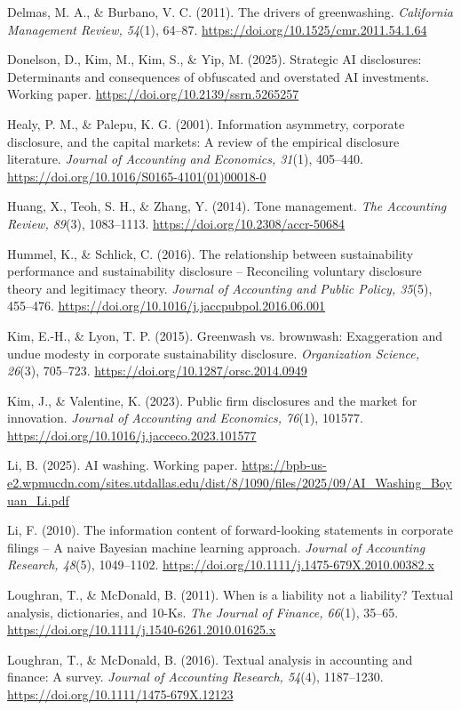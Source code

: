 Delmas, M. A., \& Burbano, V. C. (2011). The drivers of greenwashing. \textit{California Management Review, 54}(1), 64--87. \url{https://doi.org/10.1525/cmr.2011.54.1.64}

Donelson, D., Kim, M., Kim, S., \& Yip, M. (2025). Strategic AI disclosures: Determinants and consequences of obfuscated and overstated AI investments. Working paper. \url{https://doi.org/10.2139/ssrn.5265257}

Healy, P. M., \& Palepu, K. G. (2001). Information asymmetry, corporate disclosure, and the capital markets: A review of the empirical disclosure literature. \textit{Journal of Accounting and Economics, 31}(1), 405--440. \url{https://doi.org/10.1016/S0165-4101(01)00018-0}

Huang, X., Teoh, S. H., \& Zhang, Y. (2014). Tone management. \textit{The Accounting Review, 89}(3), 1083--1113. \url{https://doi.org/10.2308/accr-50684}

Hummel, K., \& Schlick, C. (2016). The relationship between sustainability performance and sustainability disclosure -- Reconciling voluntary disclosure theory and legitimacy theory. \textit{Journal of Accounting and Public Policy, 35}(5), 455--476. \url{https://doi.org/10.1016/j.jaccpubpol.2016.06.001}

Kim, E.-H., \& Lyon, T. P. (2015). Greenwash vs. brownwash: Exaggeration and undue modesty in corporate sustainability disclosure. \textit{Organization Science, 26}(3), 705--723. \url{https://doi.org/10.1287/orsc.2014.0949}

Kim, J., \& Valentine, K. (2023). Public firm disclosures and the market for innovation. \textit{Journal of Accounting and Economics, 76}(1), 101577. \url{https://doi.org/10.1016/j.jacceco.2023.101577}

Li, B. (2025). AI washing. Working paper. \url{https://bpb-us-e2.wpmucdn.com/sites.utdallas.edu/dist/8/1090/files/2025/09/AI_Washing_Boyuan_Li.pdf}

Li, F. (2010). The information content of forward-looking statements in corporate filings -- A naive Bayesian machine learning approach. \textit{Journal of Accounting Research, 48}(5), 1049--1102. \url{https://doi.org/10.1111/j.1475-679X.2010.00382.x}

Loughran, T., \& McDonald, B. (2011). When is a liability not a liability? Textual analysis, dictionaries, and 10-Ks. \textit{The Journal of Finance, 66}(1), 35--65. \url{https://doi.org/10.1111/j.1540-6261.2010.01625.x}

Loughran, T., \& McDonald, B. (2016). Textual analysis in accounting and finance: A survey. \textit{Journal of Accounting Research, 54}(4), 1187--1230. \url{https://doi.org/10.1111/1475-679X.12123}

